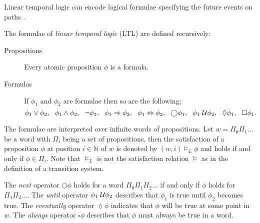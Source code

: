 Linear temporal logic can encode logical formulae specifying the future events on paths \cite{Pnueli1977}.
\begin{defi}[LTL]
The formulae of \emph{linear temporal logic} (LTL) are defined recursively:
\begin{description}
    \item[Propositions]{Every atomic proposition $\phi$ is a formula.}
    \item[Formulas]{If $\phi_{1}$ and $\phi_{2}$ are formulae then so are the following;
        \[
        \phi_{1} \lor \phi_{2},\ \ \phi_{1} \land \phi_{2}, \ \ \lnot \phi_{1}, \ \
        \phi_{1} \Rightarrow \phi_{2},\ \ \phi_{1} \Leftrightarrow \phi_{2}, \ \ \bigcirc \phi_{1}, \ \ \phi_{1} \until \phi_{2}, \ \ \lozenge \phi_{1}, \ \ \square \phi_{1}.
        \]}
\end{description}
\end{defi}
 The formulae are interpreted over infinite words of propositions. Let $w=\Pi_{0}\Pi_{1}\ldots$ be a word with $\Pi_{i}$ being a set of propositions, then the satisfaction of a proposition $\phi$ at position $i\in \mathbb{N}$ of $w$ is denoted by $(w,i)\models_{L} \phi$ and holds if and only if $\phi \in \Pi_{i}$. Note that $\models_{L}$ is not the satisfaction relation $\models$ as in the definition of a transition system.

The \emph{next} operator $\bigcirc\phi$ holds for a word $\Pi_{0}\Pi_{1}\Pi_{2}\ldots$ if and only if $\phi$ holds for $\Pi_{1}\Pi_{2}\ldots$. The \emph{until} operator $\phi_{1}\ \mathcal{U}\phi_{2}$ describes that $\phi_{1}$ is true until $\phi_{2}$ becomes true. The \emph{eventually} operator $\lozenge\phi$ indicates that $\phi$ will be true at some point in $w$. The \emph{always} operator $\square\phi$ describes that $\phi$ must always be true in a word.


